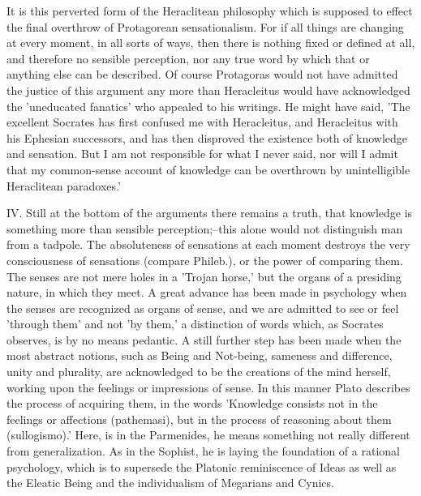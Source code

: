 It is this perverted form of the Heraclitean philosophy which is
supposed to effect the final overthrow of Protagorean sensationalism.
For if all things are changing at every moment, in all sorts of ways,
then there is nothing fixed or defined at all, and therefore no sensible
perception, nor any true word by which that or anything else can be
described. Of course Protagoras would not have admitted the justice
of this argument any more than Heracleitus would have acknowledged the
'uneducated fanatics' who appealed to his writings. He might have said,
'The excellent Socrates has first confused me with Heracleitus, and
Heracleitus with his Ephesian successors, and has then disproved the
existence both of knowledge and sensation. But I am not responsible
for what I never said, nor will I admit that my common-sense account of
knowledge can be overthrown by unintelligible Heraclitean paradoxes.'

IV. Still at the bottom of the arguments there remains a truth, that
knowledge is something more than sensible perception;--this alone would
not distinguish man from a tadpole. The absoluteness of sensations
at each moment destroys the very consciousness of sensations (compare
Phileb.), or the power of comparing them. The senses are not mere holes
in a 'Trojan horse,' but the organs of a presiding nature, in which they
meet. A great advance has been made in psychology when the senses
are recognized as organs of sense, and we are admitted to see or feel
'through them' and not 'by them,' a distinction of words which, as
Socrates observes, is by no means pedantic. A still further step has
been made when the most abstract notions, such as Being and Not-being,
sameness and difference, unity and plurality, are acknowledged to be the
creations of the mind herself, working upon the feelings or impressions
of sense. In this manner Plato describes the process of acquiring them,
in the words 'Knowledge consists not in the feelings or affections
(pathemasi), but in the process of reasoning about them (sullogismo).'
Here, is in the Parmenides, he means something not really different
from generalization. As in the Sophist, he is laying the foundation of a
rational psychology, which is to supersede the Platonic reminiscence of
Ideas as well as the Eleatic Being and the individualism of Megarians
and Cynics.

